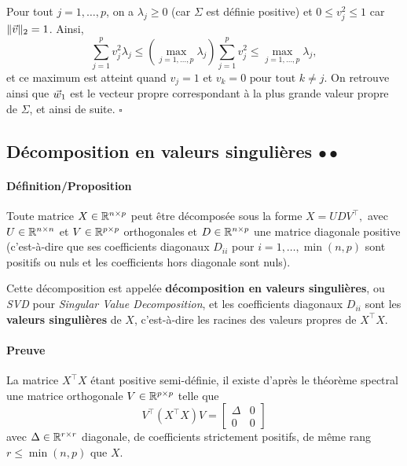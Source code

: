 Pour tout $j=1, \dots, p$, on a $\lambda_j \geq 0$ (car $\Sigma$ est définie
positive) et $0 \leq v_j^2 \leq 1$ car $\ltwonorm{\vv} = 1$. Ainsi, 
\[\sum_{j=1}^p v_j^2 \lambda_j \leq 
\left(\max_{j=1, \dots, p} \lambda_j \right)\sum_{j=1}^p
v_j^2 \leq \max_{j=1, \dots, p} \lambda_j,\]
et ce maximum est atteint quand $v_j=1$ et $v_k=0 \text{ pour tout } k \neq j$. On
retrouve ainsi que $\ww_1$ est le vecteur propre correspondant à la plus grande
valeur propre de $\Sigma$, et ainsi de suite. \hfill $\square$


\subsection{Décomposition en valeurs singulières $\bullet\bullet$}
\paragraph{Définition/Proposition} Toute matrice $X \in \mathbb{R}^{n \times p}$ peut être
décomposée sous la forme $X = U D V^\top,$ avec $U \in \mathbb{R}^{n \times n}$ et
$V \in \mathbb{R}^{p \times p}$ orthogonales et $D \in \mathbb{R}^{n \times p}$ une matrice diagonale positive
(c'est-à-dire que ses coefficients diagonaux $D_{ii}$ pour
$i=1, \dots, \min(n, p)$ sont positifs ou nuls et les coefficients hors
diagonale sont nuls).

Cette décomposition est appelée \textbf{décomposition en valeurs singulières},
ou \textit{SVD} pour \textit{Singular Value Decomposition}, et les
coefficients diagonaux $D_{ii}$ sont les \textbf{valeurs singulières} de $X$,
c'est-à-dire les racines des valeurs propres de $X^\top X$. 

\paragraph{Preuve} La matrice $X^\top X$ étant positive semi-définie, il existe d'après le théorème spectral une matrice orthogonale $V \in \mathbb{R}^{p \times p}$ telle que
\begin{equation}
  V^\top \left( X^\top X\right) V =
  \begin{bmatrix}
    \Delta & 0 \\
    0 & 0
  \end{bmatrix}
  \label{eq:diag_xtx}
\end{equation}
avec $\Delta \in \mathbb{R}^{r \times r}$ diagonale, de coefficients strictement positifs, de même rang $r \leq \min(n, p)$ que $X.$ 

